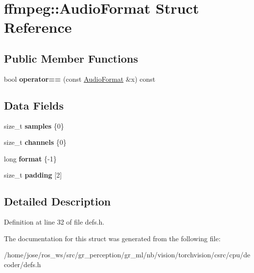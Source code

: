 \hypertarget{structffmpeg_1_1AudioFormat}{}\section{ffmpeg\+:\+:Audio\+Format Struct Reference}
\label{structffmpeg_1_1AudioFormat}
\subsection*{Public Member Functions}
\begin{DoxyCompactItemize}
\item 
\mbox{\label{structffmpeg_1_1AudioFormat_ab2a29cb33630a31361b8ad993a3a0308}} 
bool {\bfseries operator==} (const \hyperlink{structffmpeg_1_1AudioFormat}{Audio\+Format} \&x) const
\end{DoxyCompactItemize}
\subsection*{Data Fields}
\begin{DoxyCompactItemize}
\item 
\mbox{\label{structffmpeg_1_1AudioFormat_a8a3b13bebf907c4ebfc119f82b8167ff}} 
size\+\_\+t {\bfseries samples} \{0\}
\item 
\mbox{\label{structffmpeg_1_1AudioFormat_a9fc06759ce4015167977216ef689fb87}} 
size\+\_\+t {\bfseries channels} \{0\}
\item 
\mbox{\label{structffmpeg_1_1AudioFormat_a960b5692b622eabfbf29bb531456e084}} 
long {\bfseries format} \{-\/1\}
\item 
\mbox{\label{structffmpeg_1_1AudioFormat_aff81802d03d3c936f68dde50c35464d9}} 
size\+\_\+t {\bfseries padding} \mbox{[}2\mbox{]}
\end{DoxyCompactItemize}


\subsection{Detailed Description}


Definition at line 32 of file defs.\+h.



The documentation for this struct was generated from the following file\+:\begin{DoxyCompactItemize}
\item 
/home/jose/ros\+\_\+ws/src/gr\+\_\+perception/gr\+\_\+ml/nb/vision/torchvision/csrc/cpu/decoder/defs.\+h\end{DoxyCompactItemize}

